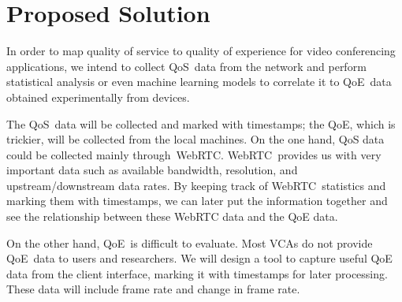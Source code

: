 \section{Proposed Solution}\label{proposed-solution}
    In order to map quality of service to quality of experience for video conferencing applications, we intend to collect QoS~data from the network and perform statistical analysis or even machine learning models to correlate it to QoE~data obtained experimentally from devices.

    The QoS~data will be collected and marked with timestamps; the QoE, which is trickier, will be collected from the local machines. On the one hand, QoS data could be collected mainly through~WebRTC. WebRTC~provides us with very important data such as available bandwidth, resolution, and upstream/downstream data rates. By keeping track of WebRTC~statistics and marking them with timestamps, we can later put the information together and see the relationship between these WebRTC data and the QoE data.

    On the other hand, QoE~is difficult to evaluate. Most VCAs do not provide QoE~data to users and researchers. We will design a tool to capture useful QoE data from the client interface, marking it with timestamps for later processing. These data will include frame rate and change in frame rate.
